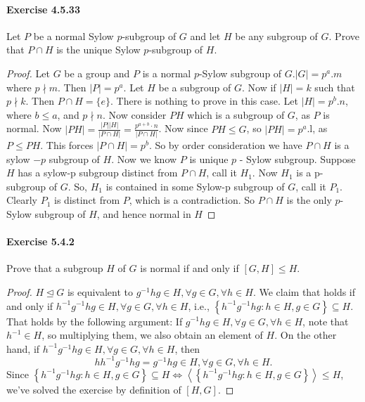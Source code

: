 \documentclass{article}
\theoremstyle{definition}
\begin{document}
\paragraph{Exercise 4.5.33} Let $P$ be a normal Sylow $p$-subgroup of $G$ and let $H$ be any subgroup of $G$. Prove that $P \cap H$ is the unique Sylow $p$-subgroup of $H$.
\begin{proof}
    Let $G$ be a group and $P$ is a normal $p$-Sylow subgroup of $G .|G|=p^a . m$ where $p \nmid m$. Then $|P|=p^a$. Let $H$ be a subgroup of $G$. Now if $|H|=k$ such that $p \nmid k$. Then $P \cap H=\{e\}$. There is nothing to prove in this case. Let $|H|=p^b . n$, where $b \leq a$, and $p \nmid n$. Now consider $P H$ which is a subgroup of $G$, as $P$ is normal. Now $|P H|=\frac{|P||H|}{|P \cap H|}=\frac{p^{a+b} \cdot n}{|P \cap H|}$. Now since $P H \leq G$, so $|P H|=p^a$.l, as $P \leq P H$. This forces $|P \cap H|=p^b$. So by order consideration we have $P \cap H$ is a sylow $-p$ subgroup of $H$. Now we know $P$ is unique $p$ - Sylow subgroup. Suppose $H$ has a sylow-p subgroup distinct from $P \cap H$, call it $H_1$. Now $H_1$ is a p-subgroup of $G$. So, $H_1$ is contained in some Sylow-p subgroup of $G$, call it $P_1$. Clearly $P_1$ is distinct from $P$, which is a contradiction. So $P \cap H$ is the only $p$-Sylow subgroup of $H$, and hence normal in $H$
\end{proof}



\paragraph{Exercise 5.4.2} Prove that a subgroup $H$ of $G$ is normal if and only if $[G, H] \leq H$.
\begin{proof}
    $H \unlhd G$ is equivalent to $g^{-1} h g \in H, \forall g \in G, \forall h \in H$. We claim that holds if and only if $h^{-1} g^{-1} h g \in H, \forall g \in G, \forall h \in H$, i.e., $\left\{h^{-1} g^{-1} h g: h \in H, g \in G\right\} \subseteq H$. That holds by the following argument:
If $g^{-1} h g \in H, \forall g \in G, \forall h \in H$, note that $h^{-1} \in H$, so multiplying them, we also obtain an element of $H$.
On the other hand, if $h^{-1} g^{-1} h g \in H, \forall g \in G, \forall h \in H$, then
$$
h h^{-1} g^{-1} h g=g^{-1} h g \in H, \forall g \in G, \forall h \in H .
$$
Since $\left\{h^{-1} g^{-1} h g: h \in H, g \in G\right\} \subseteq H \Leftrightarrow\left\langle\left\{h^{-1} g^{-1} h g: h \in H, g \in G\right\}\right\rangle \leq H$, we've solved the exercise by definition of $[H, G]$.
\end{proof}
\end{document}
